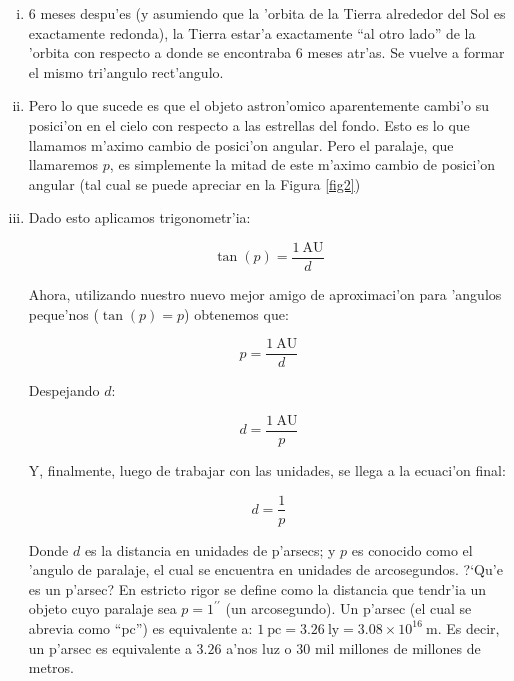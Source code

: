 \documentclass{article}
\begin{document}
\begin{enumerate} [a)]
\begin{enumerate} [i)]
\item 6 meses despu'es (y asumiendo que la 'orbita de la Tierra alrededor del Sol es exactamente redonda), la Tierra estar'a exactamente ``al otro lado'' de la 'orbita con respecto a donde se encontraba 6 meses atr'as. Se vuelve a formar el mismo tri'angulo rect'angulo.

\item Pero lo que sucede es que el objeto astron'omico aparentemente cambi'o su posici'on en el cielo con respecto a las estrellas del fondo. Esto es lo que llamamos m'aximo cambio de posici'on angular. Pero el paralaje, que llamaremos $p$, es simplemente la mitad de este m'aximo cambio de posici'on angular (tal cual se puede apreciar en la Figura \ref{fig2})

\item Dado esto aplicamos trigonometr'ia: 

\begin{equation}
\tan (p) = \frac{1 \ \text{AU}}{d}
\end{equation}

Ahora, utilizando nuestro nuevo mejor amigo de aproximaci'on para 'angulos peque'nos ($\tan (p) = p$) obtenemos que:

\begin{equation*}
p = \frac{1 \ \text{AU}}{d}
\end{equation*}

Despejando $d$:

\begin{equation*}
d = \frac{1 \ \text{AU}}{p}
\end{equation*}

Y, finalmente, luego de trabajar con las unidades, se llega a la ecuaci'on final:

\begin{equation}\label{paralaje}
d = \frac{1}{p}
\end{equation}

Donde $d$ es la distancia en unidades de p'arsecs; y $p$ es conocido como el 'angulo de paralaje, el cual se encuentra en unidades de arcosegundos. ?`Qu'e es un p'arsec? En estricto rigor se define como la distancia que tendr'ia un objeto cuyo paralaje sea $p = 1^{\prime \prime}$ (un arcosegundo). Un p'arsec (el cual se abrevia como ``pc'') es equivalente a: $1 \ \text{pc} = 3.26 \ \text{ly} = 3.08 \times 10^{16} \ \text{m}$. Es decir, un p'arsec es equivalente a $3.26$ a'nos luz o $30$ mil millones de millones de metros.
\end{enumerate}


\end{enumerate}
\end{document}
